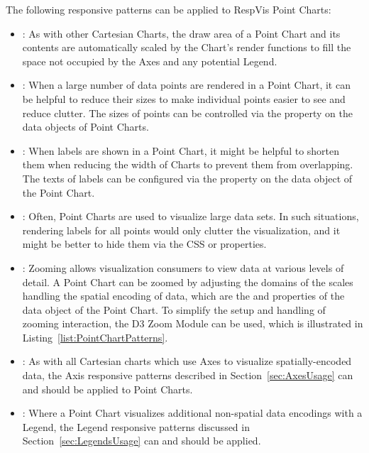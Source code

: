 The following responsive patterns can be applied to RespVis Point
Charts:
\begin{itemize}
\item {}: As with other Cartesian Charts, the
  draw area of a Point Chart and its contents are automatically
  scaled by the Chart's render functions to fill the space not
  occupied by the Axes and any potential Legend.

\item {}: When a large number of data points are
  rendered in a Point Chart, it can be helpful to reduce their sizes
  to make individual points easier to see and reduce clutter. The
  sizes of points can be controlled via the  property
  on the data objects of Point Charts.

\item {}: When labels are shown in a Point
  Chart, it might be helpful to shorten them when reducing the width
  of Charts to prevent them from overlapping. The texts of labels can
  be configured via the  property on the data object of
  the Point Chart.

\item {}: Often, Point Charts are used to
  visualize large data sets. In such situations, rendering labels
  for all points would only clutter the visualization, and it might be
  better to hide them via the CSS  or 
  properties.

\item {}: Zooming allows visualization consumers
  to view data at various levels of detail. A Point Chart can be
  zoomed by adjusting the domains of the scales handling the spatial
  encoding of data, which are the  and 
  properties of the data object of the Point Chart. To simplify the
  setup and handling of zooming interaction, the D3 Zoom Module
  \parencite{D3Zoom} can be used, which is illustrated in
  Listing~\ref{list:PointChartPatterns}.

\item {}: As with all Cartesian charts
  which use Axes to visualize spatially-encoded data, the
  Axis responsive patterns described in Section~\ref{sec:AxesUsage} can and
  should be applied to Point Charts.

\item {}: Where a Point Chart visualizes
  additional non-spatial data encodings with a Legend, the Legend
  responsive patterns discussed in Section~\ref{sec:LegendsUsage} can
  and should be applied.
\end{itemize}

